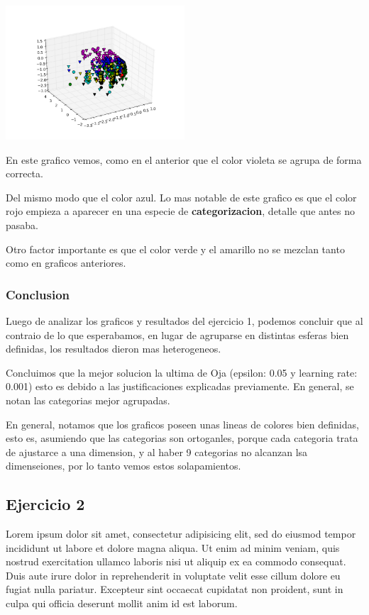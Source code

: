 \includegraphics[width=0.5\textwidth]{img/ej1_oja_005_240}

En este grafico vemos, como en el anterior que el color violeta se agrupa de forma correcta.

Del mismo modo que el color azul. Lo mas notable de este grafico es que el color rojo empieza a aparecer en una especie de \textbf{categorizacion}, detalle que antes no pasaba. 

Otro factor importante es que el color verde y el amarillo no se mezclan tanto como en graficos anteriores.

\subsubsection{Conclusion}

Luego de analizar los graficos y resultados del ejercicio 1, podemos concluir que al contraio de lo que esperabamos, en lugar de agruparse en distintas esferas bien definidas, los resultados dieron mas heterogeneos.

Concluimos que la mejor solucion la ultima de Oja (epsilon: 0.05 y learning rate: 0.001) esto es debido a las justificaciones explicadas previamente. En general, se notan las categorias mejor agrupadas.

En general, notamos que los graficos poseen unas lineas de colores bien definidas, esto es, asumiendo que las categorias son ortoganles, porque cada categoria trata de ajustarce a una dimension, y al haber 9 categorias no alcanzan lsa dimenseiones, por lo tanto vemos estos solapamientos.

\subsection{Ejercicio 2}

Lorem ipsum dolor sit amet, consectetur adipisicing elit, sed do eiusmod
tempor incididunt ut labore et dolore magna aliqua. Ut enim ad minim veniam,
quis nostrud exercitation ullamco laboris nisi ut aliquip ex ea commodo
consequat. Duis aute irure dolor in reprehenderit in voluptate velit esse
cillum dolore eu fugiat nulla pariatur. Excepteur sint occaecat cupidatat non
proident, sunt in culpa qui officia deserunt mollit anim id est laborum.